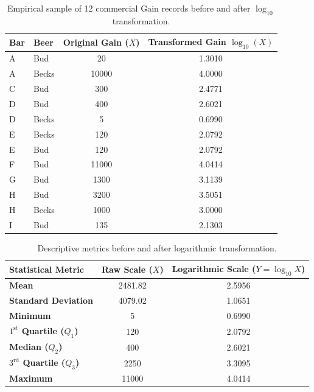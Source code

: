 \begin{table}[htbp]
    \centering
    \small
    \begin{tabular}{llcc}
        \toprule
        \textbf{Bar} & \textbf{Beer} & \textbf{Original Gain ($X$)} & \textbf{Transformed Gain $\log_{10}(X)$} \\
        \midrule
        A & Bud   & 20    & 1.3010 \\
        A & Becks & 10000 & 4.0000 \\
        C & Bud   & 300   & 2.4771 \\
        D & Bud   & 400   & 2.6021 \\
        D & Becks & 5     & 0.6990 \\
        E & Becks & 120   & 2.0792 \\
        E & Bud   & 120   & 2.0792 \\
        F & Bud   & 11000 & 4.0414 \\
        G & Bud   & 1300  & 3.1139 \\
        H & Bud   & 3200  & 3.5051 \\
        H & Becks & 1000  & 3.0000 \\
        I & Bud   & 135   & 2.1303 \\
        \bottomrule
    \end{tabular}
    \caption{Empirical sample of 12 commercial Gain records before and after $\log_{10}$ transformation.}
    \label{tab:dm-log-transform-sample}
\end{table}

\begin{table}[htbp]
    \centering
    \small
    \begin{tabularx}{\textwidth}{Xcc}
        \toprule
        \textbf{Statistical Metric} & \textbf{Raw Scale ($X$)} & \textbf{Logarithmic Scale ($Y = \log_{10} X$)} \\
        \midrule
        \textbf{Mean} & 2481.82 & 2.5956 \\
        \textbf{Standard Deviation} & 4079.02 & 1.0651 \\
        \textbf{Minimum} & 5 & 0.6990 \\
        \textbf{$1^{\text{st}}$ Quartile ($Q_1$)} & 120 & 2.0792 \\
        \textbf{Median ($Q_2$)} & 400 & 2.6021 \\
        \textbf{$3^{\text{rd}}$ Quartile ($Q_3$)} & 2250 & 3.3095 \\
        \textbf{Maximum} & 11000 & 4.0414 \\
        \bottomrule
    \end{tabularx}
    \caption{Descriptive metrics before and after logarithmic transformation.}
    \label{tab:dm-log-transform-stats}
\end{table}

